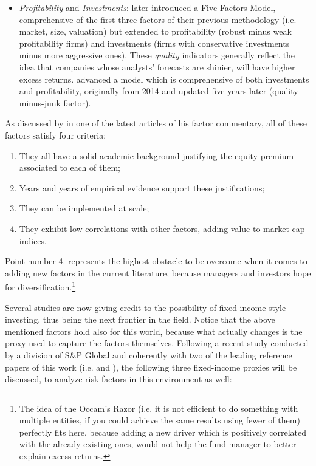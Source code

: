 \documentclass[12pt]{article}
\begin{document}
\begin{itemize}
\item \textit{Profitability} and \textit{Investments}:  later introduced a Five Factors Model, comprehensive of the first three factors of their previous methodology (i.e. market, size, valuation) but extended to profitability (robust minus weak profitability firms) and investments (firms with conservative investments minus more aggressive ones).  These \textit{quality} indicators generally reflect the idea that companies whose analysts' forecasts are shinier, will have higher excess returns.  advanced a model which is comprehensive of both investments and profitability, originally from 2014 and updated five years later (quality-minus-junk factor).

\end{itemize}

As discussed by  in one of the latest articles of his factor commentary, all of these factors satisfy four criteria:
\begin{enumerate}
\item They all have a solid academic background justifying the equity premium associated to each of them;
\item Years and years of empirical evidence support these justifications;
\item They can be implemented at scale;
\item They exhibit low correlations with other factors, adding value to market cap indices.
\end{enumerate}

Point number 4. represents the highest obstacle to be overcome when it comes to adding new factors in the current literature, because managers and investors hope for diversification.\footnote{The idea of the Occam's Razor (i.e. it is not efficient to do something with multiple entities, if you could achieve the same results using fewer of them) perfectly fits here, because adding a new driver which is positively correlated with the already existing ones, would not help the fund manager to better explain excess returns.}

Several studies are now giving credit to the possibility of fixed-income style investing, thus being the next frontier in the field. Notice that the above mentioned factors hold also for this world, because what actually changes is the proxy used to capture the factors themselves. Following a recent study conducted by a division of S\&P Global \cite{fixed-income-investing} and coherently with two of the leading reference papers of this work (i.e.  and ), the following three fixed-income proxies will be discussed, to analyze risk-factors in this environment as well:
\end{document}
